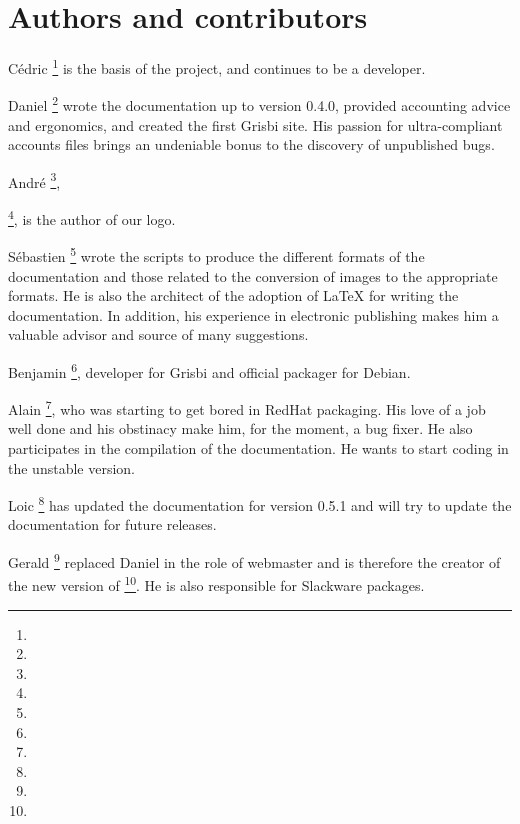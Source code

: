 
\newpage

\section{Authors and contributors\label{introduction-authors}}

{Cédric }\footnote{\urlCedricAugerEmail{}} is the basis of the project, and continues to be a developer.

{Daniel }\footnote{\urlDanielCartronEmail{}} wrote the documentation up to version 0.4.0, provided accounting advice and ergonomics, and created the first Grisbi site. His passion for ultra-compliant accounts files brings an undeniable bonus to the discovery of unpublished bugs.

{André }\footnote{\urlAndrePascualEmail{}},

\footnote{\urlLinuxGraphic{}}, is the author of our logo.

{Sébastien }\footnote{\urlSebastienBlondeelEmail{}} wrote the scripts to produce the different formats of the documentation and those related to the conversion of images to the appropriate formats. He is also the architect of the adoption of \gls{LaTeX} for writing the documentation. In addition, his experience in electronic publishing makes him a valuable advisor and source of many suggestions.

{Benjamin }\footnote{\urlBenjaminDrieuEmail{}}, developer for Grisbi and official packager for \gls{Debian}.

{Alain }\footnote{\urlDionysosEmail{}}, who was starting to get bored in \gls{RedHat} packaging. His love of a job well done and his obstinacy make him, for the moment, a bug fixer. He also participates in the compilation of the documentation. He wants to start coding in the unstable version.

{Loic }\footnote{\urlLoicBreillouxEmail{}} has updated the documentation for version 0.5.1 and will try to update the documentation for future releases.

{Gerald }\footnote{\urlGeraldNielEmail{}} replaced {Daniel } in the role of webmaster and is therefore the creator of the new version of \footnote{\urlGrisbi{}}. He is also responsible for \gls{Slackware} packages.

